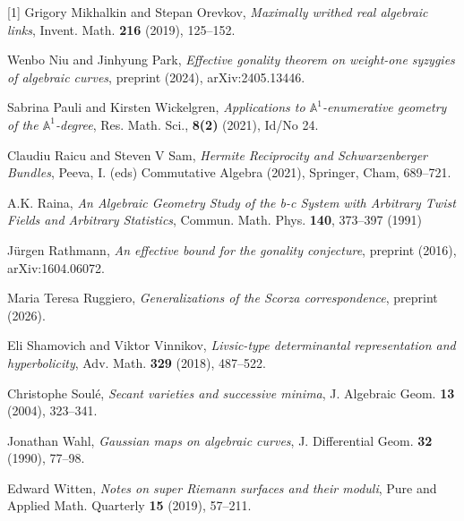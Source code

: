 \documentclass[12pt]{amsart}
\newcounter{conj}
\numberwithin{equation}{section}
\numberwithin{thmcounter}{section}
\theoremstyle{definition}
\theoremstyle{claim}
\begin{document}
\begin{thebibliography}{[1]}
     Grigory Mikhalkin and Stepan Orevkov, \textit{Maximally writhed real algebraic links}, Invent. Math. \textbf{216} (2019), 125--152.

    Wenbo Niu and Jinhyung Park, \textit{Effective gonality theorem on weight-one syzygies of algebraic curves}, preprint (2024), arXiv:2405.13446.

Sabrina Pauli and Kirsten Wickelgren,
\textit{Applications to {{\(\mathbb{A}^1\)}}-enumerative geometry of the
  {{\(\mathbb{A}^1\)}}-degree},
{Res. Math. Sci.}, \textbf{8(2)} (2021), Id/No 24.

    Claudiu Raicu and Steven V Sam,  \textit{Hermite Reciprocity and Schwarzenberger Bundles}, Peeva, I. (eds) Commutative Algebra (2021), Springer, Cham, 689--721.

     A.K. Raina, \textit{An Algebraic Geometry Study of the b-c System with Arbitrary Twist Fields and Arbitrary Statistics}, Commun. Math. Phys. \textbf{140}, 373--397 (1991)

    J\"{u}rgen Rathmann, \textit{An effective bound for the gonality conjecture}, preprint (2016), arXiv:1604.06072.

    Maria Teresa Ruggiero, \textit{Generalizations of the Scorza correspondence}, preprint (2026).

    Eli Shamovich and Viktor Vinnikov, \textit{Livsic-type determinantal representation and hyperbolicity}, Adv. Math.  \textbf{329} (2018), 487--522.

    Christophe Soul\'{e}, \textit{Secant varieties and successive minima}, J. Algebraic Geom. \textbf{13} (2004), 323--341.

    Jonathan Wahl, \textit{Gaussian maps on algebraic curves}, J. Differential Geom. \textbf{32} (1990), 77--98.

    Edward Witten, \textit{Notes on super Riemann surfaces and their moduli}, Pure and Applied Math. Quarterly
    \textbf{15} (2019), 57--211.

\end{thebibliography}
\end{document}
